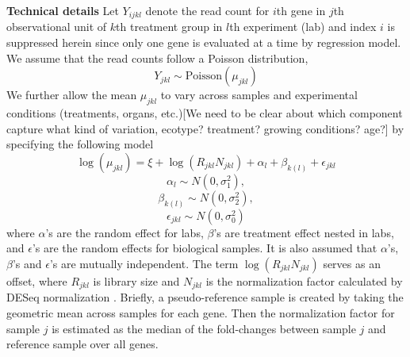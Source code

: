 \documentclass[11pt, a4paper]{article}
\begin{document}
\textbf{Technical details} Let $Y_{ijkl}$ denote the read count for $i$th gene in $j$th observational unit of $k$th treatment group in $l$th experiment (lab) and index $i$ is suppressed herein since only one gene is evaluated at a time by regression model. We assume that the read counts follow a Poisson distribution,  
  \[Y_{jkl}\sim \text{Poisson}(\mu_{jkl})\]
  We further allow the mean $\mu_{jkl}$ to vary across samples and experimental conditions (treatments, organs, etc.)[We need to be clear about which component capture what kind of variation, ecotype? treatment? growing conditions? age?] by specifying the following model 
  \begin{equation}\label{q1}
   \log( \mu_{jkl}) = \xi + \log(R_{jkl}N_{jkl})+ \alpha_l + \beta_{k(l)} + \epsilon_{jkl} 
  \end{equation}
  \[\alpha_l\sim N(0, \sigma^2_1),\] 
  \[\beta_{k(l)}\sim N(0, \sigma^2_2),\]
   \[\epsilon_{jkl}\sim N(0, \sigma_0^2)\]
  where $\alpha$'s  are the random effect for labs,  $\beta$'s are treatment effect nested in labs, and $\epsilon$'s are the random effects for biological samples. It is also assumed that $\alpha$'s, $\beta$'s and $\epsilon$'s are mutually independent. The term $\log(R_{jkl}N_{jkl})$ serves as an offset, where  $ R_{jkl}$ is library size and  $N_{jkl}$ is the normalization factor calculated by DESeq normalization \citep{anders2010differential}. Briefly, a pseudo-reference sample is created by taking the geometric mean across samples for each gene. Then the normalization factor for sample $j$ is estimated as the median of the fold-changes between sample $j$ and reference sample over all genes.
\end{document}
